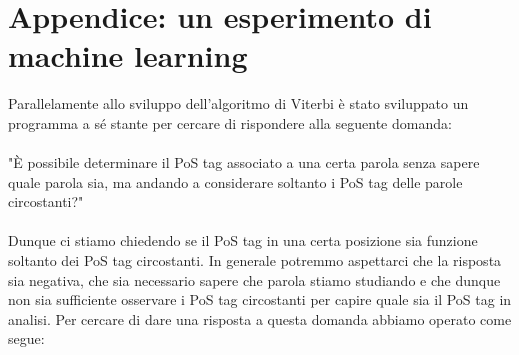\documentclass[10pt]{article}
\begin{document}
\section{Appendice: un esperimento di machine learning}
Parallelamente allo sviluppo dell'algoritmo di Viterbi è stato sviluppato un programma a sé stante per cercare di rispondere alla seguente domanda:\\
\\
"È possibile determinare il PoS tag associato a una certa parola senza sapere quale parola sia, ma andando a considerare soltanto i PoS tag delle parole circostanti?"\\
\\
Dunque ci stiamo chiedendo se il PoS tag in una certa posizione sia funzione soltanto dei PoS tag circostanti. In generale potremmo aspettarci che la risposta sia negativa, che sia necessario sapere che parola stiamo studiando e che dunque non sia sufficiente osservare i PoS tag circostanti per capire quale sia il PoS tag in analisi. Per cercare di dare una risposta a questa domanda abbiamo operato come segue:
\end{document}
